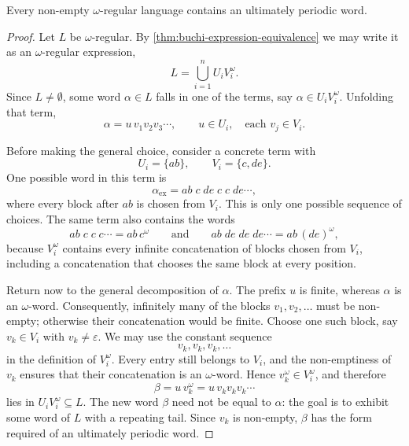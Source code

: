 \begin{corollary}
\label{cor:ultimately-periodic-witness}
Every non-empty $\omega$-regular language contains an ultimately periodic
word.
\end{corollary}

\begin{proof}
Let $L$ be $\omega$-regular.  By
\cref{thm:buchi-expression-equivalence} we may write it as an
$\omega$-regular expression,
\[
  L=\bigcup_{i=1}^{n} U_i V_i^\omega .
\]
Since $L\neq\emptyset$, some word $\alpha\in L$ falls in one of the terms,
say $\alpha\in U_i V_i^\omega$.  Unfolding that term,
\[
  \alpha = u\,v_1 v_2 v_3\cdots ,
  \qquad u\in U_i,\quad \text{each } v_j\in V_i .
\]

Before making the general choice, consider a concrete term with
\[
  U_i=\{ab\},
  \qquad
  V_i=\{c,de\}.
\]
One possible word in this term is
\[
  \alpha_{\mathrm{ex}}
  =ab\;c\;de\;c\;c\;de\cdots ,
\]
where every block after $ab$ is chosen from $V_i$.  This is only one
possible sequence of choices.  The same term also contains the words
\[
  ab\;c\;c\;c\cdots = ab\,c^\omega
  \qquad\text{and}\qquad
  ab\;de\;de\;de\cdots = ab\,(de)^\omega,
\]
because $V_i^\omega$ contains every infinite concatenation of blocks
chosen from $V_i$, including a concatenation that chooses the same block
at every position.

Return now to the general decomposition of $\alpha$.  The prefix $u$ is
finite, whereas $\alpha$ is an $\omega$-word.  Consequently, infinitely
many of the blocks $v_1,v_2,\dots$ must be non-empty; otherwise their
concatenation would be finite.  Choose one such block, say
$v_k\in V_i$ with $v_k\neq\varepsilon$.  We may use the constant sequence
\[
  v_k,v_k,v_k,\dots
\]
in the definition of $V_i^\omega$.  Every entry still belongs to $V_i$,
and the non-emptiness of $v_k$ ensures that their concatenation is an
$\omega$-word.  Hence $v_k^\omega\in V_i^\omega$, and therefore
\[
  \beta = u\,v_k^\omega = u\,v_k v_k v_k\cdots
\]
lies in $U_i V_i^\omega\subseteq L$.  The new word $\beta$ need not be
equal to $\alpha$: the goal is to exhibit some word of $L$ with a repeating
tail.  Since $v_k$ is non-empty, $\beta$ has the form required of an
ultimately periodic word.
\end{proof}

